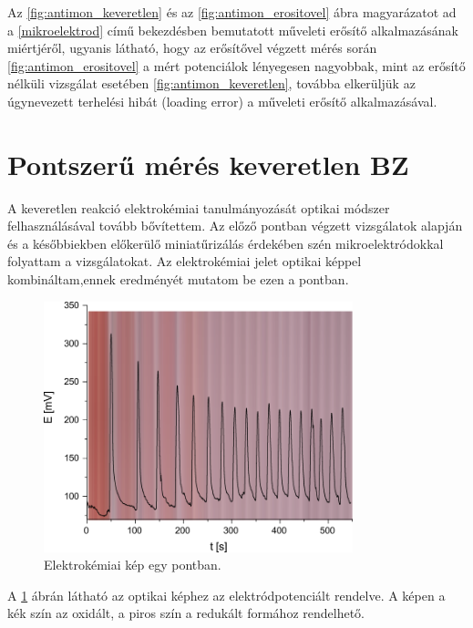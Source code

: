 Az \ref{fig:antimon_keveretlen} és az \ref{fig:antimon_erositovel} ábra magyarázatot ad a \ref{mikroelektrod} című bekezdésben bemutatott műveleti erősítő alkalmazásának miértjéről, ugyanis látható, hogy az erősítővel végzett mérés során \ref{fig:antimon_erositovel} a mért potenciálok lényegesen nagyobbak, mint az erősítő nélküli vizsgálat esetében \ref{fig:antimon_keveretlen}, továbba elkerüljük az úgynevezett terhelési hibát (loading error) a műveleti erősítő alkalmazásával.

\section{Pontszerű mérés keveretlen BZ}
A keveretlen reakció elektrokémiai tanulmányozását optikai módszer felhasználásával tovább bővítettem. Az előző pontban végzett vizsgálatok alapján és a későbbiekben előkerülő miniatűrizálás érdekében szén mikroelektródokkal folyattam a vizsgálatokat. Az elektrokémiai jelet optikai képpel kombináltam,ennek eredményét  mutatom be ezen a pontban.
\begin{figure}[h]
\centering
\includegraphics[width=0.8\textwidth]{img/pontszerumeres.png}
\caption{Elektrokémiai kép egy pontban.}
\label{fig:pontszerumeres}
\end{figure}

A \ref{fig:pontszerumeres} ábrán látható az optikai képhez az elektródpotenciált rendelve. A képen a kék szín az oxidált, a piros szín a redukált formához rendelhető.

